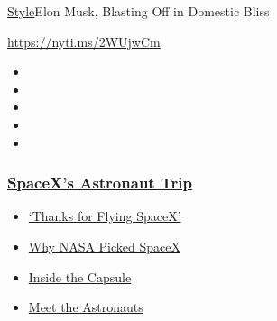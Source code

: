 \href{/section/style}{Style}\textbar{}Elon Musk, Blasting Off in
Domestic Bliss

\url{https://nyti.ms/2WUjwCm}

\begin{itemize}
\item
\item
\item
\item
\item
\end{itemize}

\hypertarget{spacexs-astronaut-trip}{%
\subsubsection{\texorpdfstring{\href{https://www.nytimes3xbfgragh.onion/2020/08/02/science/spacex-astronauts-splashdown.html?name=styln-nasa-spacex\&region=TOP_BANNER\&block=storyline_menu_recirc\&action=click\&pgtype=Article\&impression_id=45fd9bc0-f2cc-11ea-9650-8b5c976985f6\&variant=undefined}{SpaceX's
Astronaut
Trip}}{SpaceX's Astronaut Trip}}\label{spacexs-astronaut-trip}}

\begin{itemize}
\tightlist
\item
  \href{https://www.nytimes3xbfgragh.onion/2020/08/02/science/spacex-astronauts-splashdown.html?name=styln-nasa-spacex\&region=TOP_BANNER\&block=storyline_menu_recirc\&action=click\&pgtype=Article\&impression_id=45fd9bc0-f2cc-11ea-9650-8b5c976985f6\&variant=undefined}{`Thanks
  for Flying SpaceX'}
\item
  \href{https://www.nytimes3xbfgragh.onion/2020/05/26/science/spacex-launch-nasa.html?name=styln-nasa-spacex\&region=TOP_BANNER\&block=storyline_menu_recirc\&action=click\&pgtype=Article\&impression_id=45fdc2d0-f2cc-11ea-9650-8b5c976985f6\&variant=undefined}{Why
  NASA Picked SpaceX}
\item
  \href{https://www.nytimes3xbfgragh.onion/interactive/2020/05/26/science/spacex-nasa.html?name=styln-nasa-spacex\&region=TOP_BANNER\&block=storyline_menu_recirc\&action=click\&pgtype=Article\&impression_id=45fdc2d1-f2cc-11ea-9650-8b5c976985f6\&variant=undefined}{Inside
  the Capsule}
\item
  \href{https://www.nytimes3xbfgragh.onion/2020/05/27/science/bob-behnken-doug-hurley.html?name=styln-nasa-spacex\&region=TOP_BANNER\&block=storyline_menu_recirc\&action=click\&pgtype=Article\&impression_id=45fdc2d2-f2cc-11ea-9650-8b5c976985f6\&variant=undefined}{Meet
  the Astronauts}
\end{itemize}

